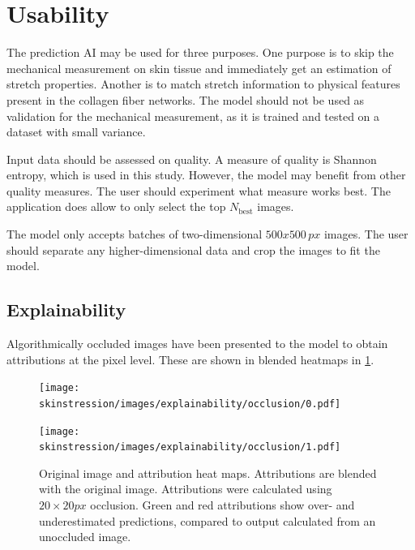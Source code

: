\section{Usability}
The prediction AI may be used for three purposes.
One purpose is to skip the mechanical measurement on skin tissue and immediately get an estimation of stretch properties.
Another is to match stretch information to physical features present in the collagen fiber networks.
The model should not be used as validation for the mechanical measurement, as it is trained and tested on a dataset with small variance.

Input data should be assessed on quality.
A measure of quality is Shannon entropy, which is used in this study.
However, the model may benefit from other quality measures.
The user should experiment what measure works best.
The application does allow to only select the top $N_\mathrm{best}$ images.

The model only accepts batches of two-dimensional $500x500\,\unit{px}$ images.
The user should separate any higher-dimensional data and crop the images to fit the model.

\subsection{Explainability}
Algorithmically occluded images have been presented to the model to obtain attributions at the pixel level.
These are shown in blended heatmaps in \cref{fig:skin_occlusion}.

\begin{figure}
    \ContinuedFloat
    \centering
    \texttt{[image: skinstression/images/explainability/occlusion/0.pdf]}
\end{figure}
\begin{figure}
    \centering
    \texttt{[image: skinstression/images/explainability/occlusion/1.pdf]}
    \caption[Original image and attribution heat maps]{
        Original image and attribution heat maps.
        Attributions are blended with the original image.
        Attributions were calculated using $20\times 20\unit{px}$ occlusion.
        Green and red attributions show over- and underestimated predictions, compared to output calculated from an unoccluded image.
    }
    \label{fig:skin_occlusion}
\end{figure}
